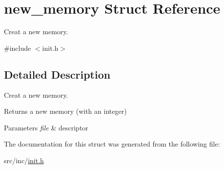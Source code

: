 \hypertarget{structnew__memory}{}\section{new\+\_\+memory Struct Reference}
\label{structnew__memory}


Creat a new memory.  




{\ttfamily \#include $<$init.\+h$>$}



\subsection{Detailed Description}
Creat a new memory. 

\begin{DoxyReturn}{Returns}
a new memory (with an integer) 
\end{DoxyReturn}

\begin{DoxyParams}{Parameters}
{\em file} & descriptor \\
\hline
\end{DoxyParams}


The documentation for this struct was generated from the following file\+:\begin{DoxyCompactItemize}
\item 
src/inc/\mbox{\hyperlink{init_8h}{init.\+h}}\end{DoxyCompactItemize}
